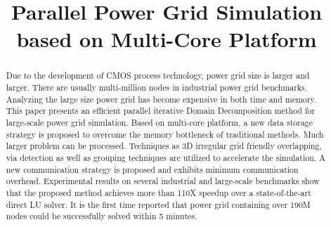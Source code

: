 \documentclass{sig-alternate}
\begin{document}
\title{Parallel Power Grid Simulation based on Multi-Core Platform}

\maketitle

\begin{comment}
This paper presents an efficient parallel Domain Decomposition method for large-scale power grid simulation. 
Based on multi-core platform, a new data storage strategy is proposed to overcome the memory bottleneck of traditional methods. 
Techniques as 3D irregular grid friendly overlapping, via detection as well as grouping techniques are utilized to accelerate the 
simulation. A new communication strategy is proposed and exhibits minimum communication overhead. Experimental results on several 
industrial and large-scale benchmarks show that the proposed method achieves more than 110X speedup over a state-of-the-art direct 
LU solver. Power grid containing over 190M nodes could be solved within 5 minutes.
\end{comment}

\begin{abstract}
Due to the development of CMOS process technology, power grid size is larger and larger. There are usually multi-million nodes in 
industrial power grid benchmarks. Analyzing the large size power grid has become expensive in both time and memory. This paper presents 
an efficient parallel iterative Domain Decomposition method for large-scale power grid simulation. Based on multi-core platform, a new 
data storage strategy is proposed to overcome the memory bottleneck of traditional methods. Much larger problem can be processed. 
Techniques as 3D irregular grid friendly overlapping, via detection as well as grouping techniques are utilized to accelerate the 
simulation. A new communication strategy is proposed and exhibits minimum communication overhead. Experimental results on several 
industrial and large-scale benchmarks show that the proposed method achieves more than 110X speedup over a state-of-the-art direct 
LU solver. It is the first time reported that power grid containing over 190M nodes could be successfully solved within 5 minutes.	
\end{abstract}
\end{document}
